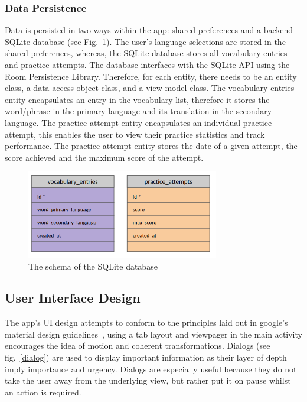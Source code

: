 \documentclass[runningheads]{llncs}
\begin{document}
	\subsubsection{Data Persistence}
	Data is persisted in two ways within the app: shared preferences and a backend SQLite database (see Fig.~\ref{schema}). The user's language selections are stored in the shared preferences, whereas, the SQLite database stores all vocabulary entries and practice attempts. The database interfaces with the SQLite API using the Room Persistence Library. Therefore, for each entity, there needs to be an entity class, a data access object class, and a view-model class. The vocabulary entries entity encapsulates an entry in the vocabulary list, therefore it stores the word/phrase in the primary language and its translation in the secondary language. The practice attempt entity encapsulates an individual practice attempt, this enables the user to view their practice statistics and track performance. The practice attempt entity stores the date of a given attempt, the score achieved and the maximum score of the attempt. 
	
	\newpage
	
	\begin{figure}
		\centering
		\includegraphics[width=0.75\textwidth]{./img/schema.png}
		\caption{The schema of the SQLite database}
		\label{schema}
	\end{figure}
	
	\subsection{User Interface Design}
	The app's UI design attempts to conform to the principles laid out in google's material design guidelines~\cite{ref_material_design}, using a tab layout and viewpager in the main activity encourages the idea of motion and coherent transformations. Dialogs (see fig.~\ref{dialog}) are used to display important information as their layer of depth imply importance and urgency. Dialogs are especially useful because they do not take the user away from the underlying view, but rather put it on pause whilst an action is required.
	
\end{document}
